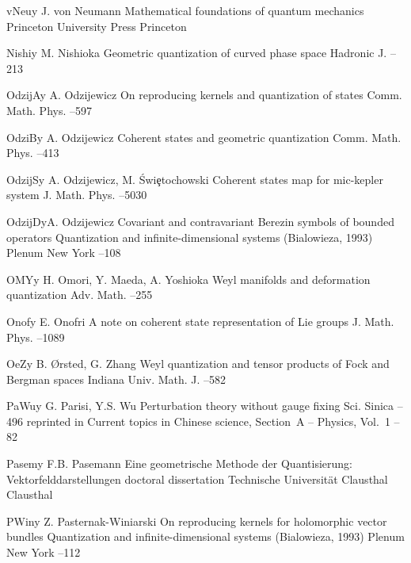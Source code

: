 \documentclass[12pt]{amsart}
\numberwithin{equation}{section}
\theoremstyle{remark}
\newcommand{\by}{\mathbf y}
\begin{document}
\begin{thebibliography}{199}
 vNeu\by{ J. von Neumann \book Mathematical foundations of quantum
mechanics \publ Princeton University Press \publaddr Princeton }

 Nishi\by{ M. Nishioka \paper Geometric quantization of curved phase
space \jour Hadronic J.   --213}

 OdzijA\by{ A. Odzijewicz \paper On reproducing kernels and quantization
of states \jour Comm. Math. Phys.   --597}

 OdziB\by{ A. Odzijewicz \paper Coherent states and geometric quantization
\jour Comm. Math. Phys.   --413}

 OdzijS\by{ A. Odzijewicz, M. \'Swi\c{e}tochowski \paper Coherent
states map for mic-kepler system \jour J. Math. Phys.  
--5030}

 OdzijD\by{A. Odzijewicz \paper Covariant and contravariant Berezin
symbols of bounded operators \inbook Quantization and infinite-dimensional
systems (Bialowieza, 1993)  \publ Plenum \publaddr New York  --108}

 OMY\by{ H. Omori, Y. Maeda, A. Yoshioka \paper Weyl manifolds and
deformation quantization \jour Adv. Math.   --255}

 Onof\by{ E. Onofri \paper A note on coherent state representation of Lie
groups \jour J. Math. Phys.   --1089}

 OeZ\by{ B. \O rsted, G. Zhang \paper Weyl quantization and tensor
products of Fock and Bergman spaces \jour Indiana Univ. Math. J. 
 --582}

 PaWu\by{ G. Parisi, Y.S. Wu \paper Perturbation theory without gauge
fixing \jour Sci. Sinica   --496 \moreref \inbook
reprinted in Current topics in Chinese science, Section~A -- Physics, Vol.~1
--82}

 Pasem\by{ F.B. Pasemann \book Eine geometrische Methode der
Quantisierung: Vektorfelddarstellungen \bookinfo doctoral dissertation \publ
Technische Universit\"at Clausthal \publaddr Clausthal }

 PWin\by{ Z. Pasternak-Winiarski \paper On reproducing kernels for
holomorphic vector bundles \inbook Quantization and infinite-dimensional
systems (Bialowieza, 1993)  \publ Plenum \publaddr New York  --112}


\end{thebibliography}
\end{document}
